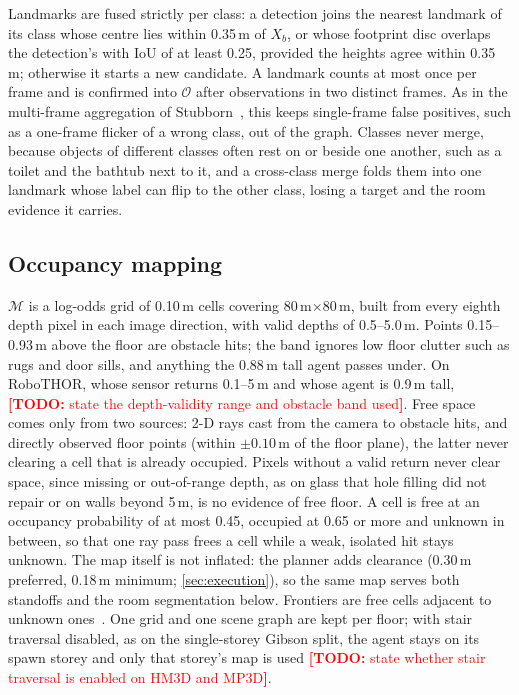 \documentclass[10pt]{article}
\newcommand{\TODO}[1]{\textcolor{red}{\textbf{[TODO:} #1\textbf{]}}}
\newcommand{\M}{\mathcal{M}}
\newcommand{\Ob}{\mathcal{O}}
\begin{document}
Landmarks are fused strictly per class: a detection joins the nearest landmark of its class whose centre lies within
0.35\,m of $X_b$, or whose footprint disc overlaps the detection's with IoU of at least 0.25, provided the heights agree
within 0.35\,m; otherwise it starts a new candidate. A landmark counts at most once per frame and is confirmed into
$\Ob$ after observations in two distinct frames. As in the multi-frame aggregation of Stubborn~\citep{luo2022stubborn},
this keeps single-frame false positives, such as a one-frame flicker of a wrong class, out of the graph. Classes never
merge, because objects of different classes often rest on or beside one another, such as a toilet and the bathtub next
to it, and a cross-class merge folds them into one landmark whose label can flip to the other class, losing a target
and the room evidence it carries.

\subsection{Occupancy mapping}\label{sec:perception-occupancy}

$\M$ is a log-odds grid of 0.10\,m cells covering 80\,m$\times$80\,m, built from every eighth depth pixel in each image
direction, with valid depths of 0.5--5.0\,m. Points 0.15--0.93\,m above the floor are obstacle hits; the band ignores
low floor clutter such as rugs and door sills, and anything the 0.88\,m tall agent passes under. On RoboTHOR, whose
sensor returns 0.1--5\,m and whose agent is 0.9\,m tall, \TODO{state the depth-validity range and obstacle band
used}. Free space comes only
from two sources: 2-D rays cast from the camera to obstacle hits, and directly observed floor points (within
$\pm 0.10$\,m of the floor plane), the latter never clearing a cell that is already occupied. Pixels without a valid
return never clear space, since missing or out-of-range depth, as on glass that hole filling did not repair or on walls
beyond 5\,m, is no evidence of free floor. A cell is free at
an occupancy probability of at most 0.45, occupied at 0.65 or more and unknown in between, so that one ray pass frees a
cell while a weak, isolated hit stays unknown. The map itself is not inflated: the planner adds clearance (0.30\,m
preferred, 0.18\,m minimum; \cref{sec:execution}), so the same map serves both standoffs and the room segmentation
below. Frontiers are free cells adjacent to unknown ones~\citep{yamauchi1997frontier}. One grid and one scene graph are kept per floor;
with stair traversal disabled, as on the single-storey Gibson split, the agent stays on its spawn storey and only that
storey's map is used \TODO{state whether stair traversal is enabled on HM3D and MP3D}.
\end{document}
